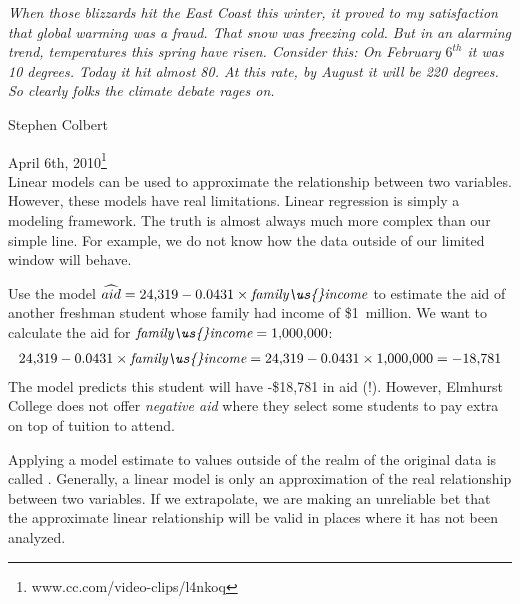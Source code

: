 {\em\small When those blizzards hit the East Coast this winter,
it proved to my satisfaction that global warming was a fraud.
That snow was freezing cold.
But in an alarming trend, temperatures this spring have risen.
Consider this: On February $6^{th}$ it was 10 degrees.
Today it hit almost 80. At this rate, by August it will be
220 degrees.
So clearly folks the climate debate rages on.\vspace{0.5mm}}

\noindent\hspace{\textwidth}\hspace{-40mm}Stephen Colbert

\noindent\hspace{\textwidth}\hspace{-40mm}April 6th,
2010\footnote{
    {www.cc.com/video-clips/l4nkoq}} \\

Linear models can be used to approximate the relationship
between two variables.
However, these models have real limitations.
Linear regression is simply a modeling framework.
The truth is almost always much more complex than our simple line.
For example, we do not know how the data outside of our limited
window will behave.

\begin{examplewrap}
\begin{nexample}{Use the model
    $\widehat{aid}
      = \text{24,319} - 0.0431 \times
          \textit{family\us{}income}$
    to estimate the aid of another freshman student whose
    family had income of \$1~million.}
  We want to calculate the aid for
  $\textit{family\us{}income} = \text{1,000,000}$:
  \begin{align*}
  \text{24,319} - 0.0431\times \textit{family\us{}income}
    = \text{24,319} - 0.0431\times \text{1,000,000}
    = -\text{18,781}
  \end{align*}
  The model predicts this student will have -\$18,781 in aid (!).
  However, Elmhurst College does not offer \emph{negative aid}
  where they select some students to pay extra on top of tuition
  to attend.
\end{nexample}
\end{examplewrap}

Applying a model estimate to values outside of the realm of the
original data is called .
Generally, a linear model is only an approximation of the real
relationship between two variables.
If we extrapolate, we are making an unreliable bet that the
approximate linear relationship will be valid in places where
it has not been analyzed.

